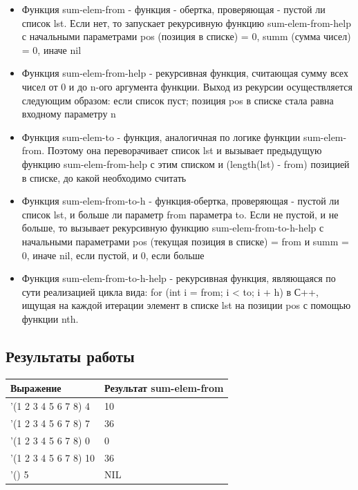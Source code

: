 \documentclass[a4paper,12pt]{article}
\begin{document}
 	\begin{itemize}
 		\item Функция sum-elem-from - функция - обертка, проверяющая - пустой ли список lst. Если нет, то запускает рекурсивную функцию sum-elem-from-help с начальными параметрами pos (позиция в списке) = 0, summ (сумма чисел) = 0, иначе nil
 		\item Функция sum-elem-from-help - рекурсивная функция, считающая сумму всех чисел от 0 и до n-ого аргумента функции. Выход из рекурсии осуществляется следующим образом: если список пуст; позиция pos в списке стала равна входному параметру n
 		\item Функция sum-elem-to - функция, аналогичная по логике функции sum-elem-from. Поэтому она переворачивает список lst и вызывает предыдущую функцию sum-elem-from-help с этим списком и (length(lst) - from) позицией в списке, до какой необходимо считать
 		\item Функция sum-elem-from-to-h - функция-обертка, проверяющая - пустой ли список lst, и больше ли параметр from параметра to. Если не пустой, и не больше, то вызывает рекурсивную функцию sum-elem-from-to-h-help с начальными параметрами pos (текущая позиция в списке) = from и summ = 0, иначе nil, если пустой, и 0, если больше
 		\item Функция sum-elem-from-to-h-help - рекурсивная функция, являющаяся по сути реализацией цикла вида: for (int i = from; i < to; i + h) в С++, ищущая на каждой итерации элемент в списке lst на позиции pos с помощью функции nth.
 	\end{itemize}
 	
 	\subsection*{Результаты работы}
 	
    \begin{table} [h!]
 		\begin{center}
 			\begin{tabular}{|l|l|}
 				\hline
 				{\bf  Выражение} & {\bf Результат sum-elem-from} \\
 				\hline
 				{'(1 2 3 4 5 6 7 8) 4} & 10\\
 				\hline
 				{'(1 2 3 4 5 6 7 8) 7} & 36\\
 				\hline
 				{'(1 2 3 4 5 6 7 8) 0} & 0\\
 				\hline
 				{'(1 2 3 4 5 6 7 8) 10} & 36\\
 				\hline
 				{'() 5} & NIL\\
 				\hline
 			\end{tabular}  
 			\label{m2}
 		\end{center}
 	\end{table}
 
\end{document}
